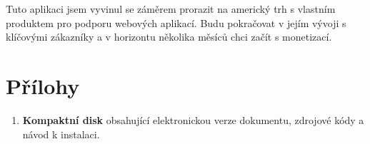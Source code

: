 \documentclass[bc,male,java,dept456]{diploma}						%
\begin{document}
Tuto aplikaci jsem vyvinul se záměrem prorazit na americký trh s vlastním produktem pro podporu webových aplikací. Budu pokračovat v jejím vývoji s klíčovými zá\-ka\-zní\-ky a v horizontu několika měsíců chci začít s monetizací.

\section{Přílohy}

\begin{enumerate}
\item \textbf{Kompaktní disk} obsahující elektronickou verze dokumentu, zdrojové kódy a návod k instalaci.
\end{enumerate}
\end{document}
